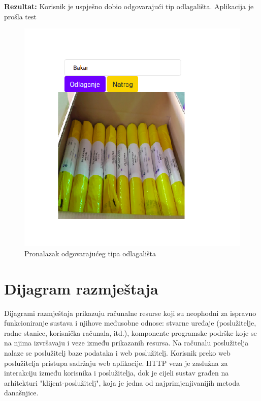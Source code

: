 			\textbf{Rezultat:} Korisnik je uspješno dobio odgovarajući tip odlagališta. Aplikacija je prošla test
			
			\begin{figure}[H]
				\includegraphics[scale=0.6]{slike/Tip_odlagalista.png}
				\centering
				\caption{Pronalazak odgovarajućeg tipa odlagališta}
				\label{fig:Tip_odlagalista}
			\end{figure}
			
			
			\eject 
		
		
			\section{Dijagram razmještaja}
		
		
		
		Dijagrami razmještaja prikazuju računalne resurse koji su neophodni za ispravno funkcioniranje sustava i njihove međusobne odnose: stvarne uređaje (poslužitelje, radne stanice, korisnička računala, itd.), komponente programske podrške koje se na njima izvršavaju i veze između
		prikazanih resursa. Na računalu poslužitelja nalaze se poslužitelj baze podataka i web poslužitelj. Korisnik preko web poslužitelja pristupa sadržaju web aplikacije. HTTP veza je zaslužna za interakciju između korisnika i poslužitelja, dok je cijeli sustav građen na arhitekturi "klijent-poslužitelj", koja je jedna od najprimjenjivanijih metoda današnjice.
		
